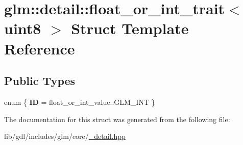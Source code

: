 \hypertarget{structglm_1_1detail_1_1float__or__int__trait_3_01uint8_01_4}{}\section{glm\+:\+:detail\+:\+:float\+\_\+or\+\_\+int\+\_\+trait$<$ uint8 $>$ Struct Template Reference}
\label{structglm_1_1detail_1_1float__or__int__trait_3_01uint8_01_4}
\subsection*{Public Types}
\begin{DoxyCompactItemize}
\item 
\hypertarget{structglm_1_1detail_1_1float__or__int__trait_3_01uint8_01_4_ab550c4860928eb61a489c71a6bbe99dc}{}enum \{ {\bfseries I\+D} = float\+\_\+or\+\_\+int\+\_\+value\+:\+:G\+L\+M\+\_\+\+I\+N\+T
 \}\label{structglm_1_1detail_1_1float__or__int__trait_3_01uint8_01_4_ab550c4860928eb61a489c71a6bbe99dc}

\end{DoxyCompactItemize}


The documentation for this struct was generated from the following file\+:\begin{DoxyCompactItemize}
\item 
lib/gdl/includes/glm/core/\hyperlink{__detail_8hpp}{\+\_\+detail.\+hpp}\end{DoxyCompactItemize}
